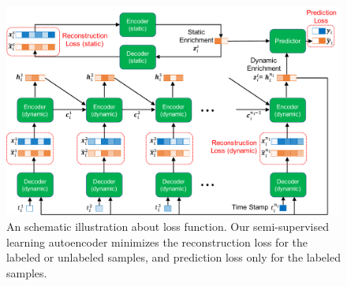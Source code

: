 \begin{figure}
    \includegraphics[width=\textwidth]{images/objective.pdf}
    \caption{An schematic illustration about loss function. Our semi-supervised learning autoencoder minimizes the reconstruction loss for the labeled or unlabeled samples, and prediction loss only for the labeled samples.} \label{fig: objective}
\end{figure}
